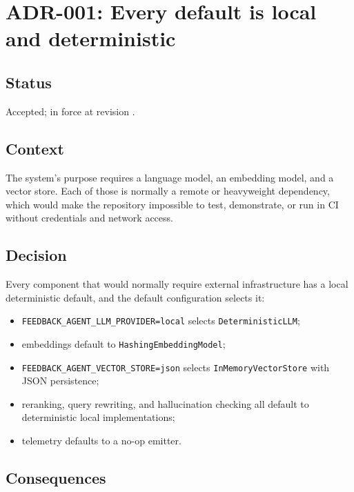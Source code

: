 \section{ADR-001: Every default is local and deterministic}
\label{adr:001}

\subsection*{Status}

Accepted; in force at revision \texttt{\projectrevisionshort}.

\subsection*{Context}

The system's purpose requires a language model, an embedding model, and a
vector store. Each of those is normally a remote or heavyweight dependency,
which would make the repository impossible to test, demonstrate, or run in CI
without credentials and network access.

\subsection*{Decision}

Every component that would normally require external infrastructure has a
local deterministic default, and the default configuration selects it:

\begin{itemize}[nosep]
  \item \texttt{FEEDBACK\_AGENT\_LLM\_PROVIDER=local} selects
    \texttt{DeterministicLLM};
  \item embeddings default to \texttt{HashingEmbeddingModel};
  \item \texttt{FEEDBACK\_AGENT\_VECTOR\_STORE=json} selects
    \texttt{InMemoryVectorStore} with JSON persistence;
  \item reranking, query rewriting, and hallucination checking all default to
    deterministic local implementations;
  \item telemetry defaults to a no-op emitter.
\end{itemize}

\subsection*{Consequences}

